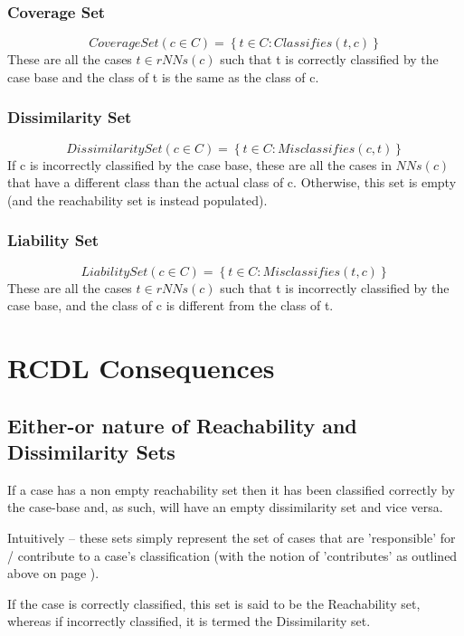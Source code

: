 \documentclass[a4paper,11pt]{report}
\begin{document}
\subsubsection{Coverage Set}
\[ CoverageSet(c \in C) = \left\lbrace t \in C : Classifies(t, c) \right\rbrace \]
These are all the cases $ t \in rNNs(c) $ such that t is correctly classified by the case base and the class of t is the same as the class of c.

\subsubsection{Dissimilarity Set}
\[ DissimilaritySet(c \in C) = \left\lbrace t \in C : Misclassifies(c, t) \right\rbrace \]  \cite{Delany2009}
If c is incorrectly classified by the case base, these are all the cases in $ NNs(c) $ that have a different class than the actual class of c. Otherwise, this set is empty (and the reachability set is instead populated).

\subsubsection{Liability Set}
\[ LiabilitySet(c \in C) = \left\lbrace t \in C : Misclassifies(t, c) \right\rbrace \]  \cite{Delany2009}
These are all the cases $ t \in rNNs(c) $ such that t is incorrectly classified by the case base, and the class of c is different from the class of t.

\section{RCDL Consequences}

\subsection{Either-or nature of Reachability and Dissimilarity Sets}
If a case has a non empty reachability set then it has been classified correctly by the case-base and, as such, will have an empty dissimilarity set and vice versa.

Intuitively – these sets simply represent the set of cases that are 'responsible' for / contribute to a case's classification (with the notion of 'contributes' as outlined above on page \pageref{sec:contributes}). 

If the case is correctly classified, this set is said to be the Reachability set, whereas if incorrectly classified, it is termed the Dissimilarity set.
\end{document}
